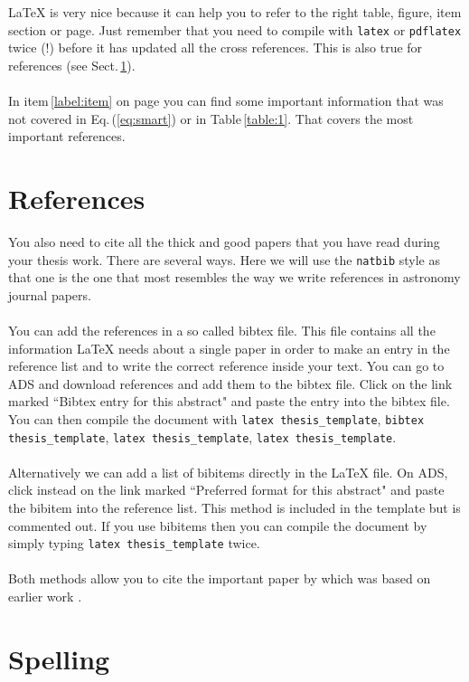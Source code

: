 \documentclass[12pt]{report}
\begin{document}
LaTeX is very nice because it can help you to refer to the right table, figure,
item section or page. Just remember that you need to compile with {\tt latex}
or {\tt pdflatex} twice (!) before it has updated all the cross references.
This is also true for references (see Sect.\,\ref{sect:refs}).
\\ \\
In item\,\ref{label:item} on page \pageref{label:item} you can find some
important information that was not covered in Eq.\,(\ref{eq:smart}) or in
Table\,\ref{table:1}. That covers the most important references.

\section{References}
\label{sect:refs}

You also need to cite all the thick and good papers that you have read during
your thesis work. There are several ways. Here we will use the {\tt natbib}
style as that one is the one that most resembles the way we write references in
astronomy journal papers. 
\\ \\
You can add the references in a so called bibtex file. This file contains all
the information LaTeX needs about a single paper in order to make an entry in
the reference list and to write the correct reference inside your text. You can
go to ADS and download references and add them to the bibtex file. Click
on the link marked ``Bibtex entry for this abstract" and paste the entry into
the bibtex file. You can then compile the document with {\tt latex
thesis\_template}, {\tt bibtex thesis\_template}, {\tt latex thesis\_template},
{\tt latex thesis\_template}.
\\ \\
Alternatively we can add a list of bibitems directly in the LaTeX file. On ADS,
click instead on the link marked ``Preferred format for this abstract" and
paste the bibitem into the reference list. This method is included in the
template but is commented out. If you use bibitems then you can compile the
document by simply typing {\tt latex thesis\_template} twice.
\\ \\
Both methods allow you to cite the important paper by
\cite{2007MNRAS.375..500A} which was based on earlier work
\citep{2001A&A...373.1019S}.

\section{Spelling}
\end{document}
